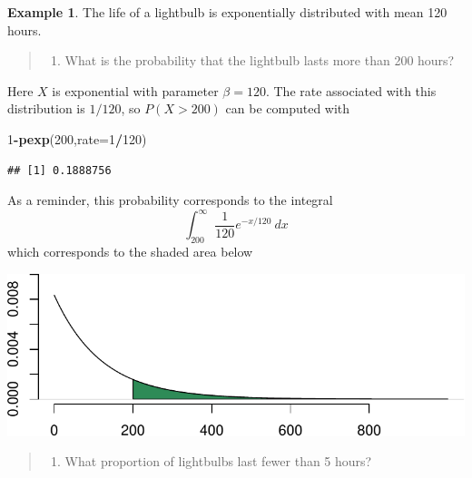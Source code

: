 \documentclass[
]{book}
\newenvironment{Shaded}{\begin{snugshade}}{\end{snugshade}}
\newcommand{\AttributeTok}[1]{\textcolor[rgb]{0.13,0.29,0.53}{#1}}
\newcommand{\DecValTok}[1]{\textcolor[rgb]{0.00,0.00,0.81}{#1}}
\newcommand{\FunctionTok}[1]{\textcolor[rgb]{0.13,0.29,0.53}{\textbf{#1}}}
\newcommand{\NormalTok}[1]{#1}
\newcommand{\SpecialCharTok}[1]{\textcolor[rgb]{0.81,0.36,0.00}{\textbf{#1}}}
\providecommand{\tightlist}{%
  \setlength{\itemsep}{0pt}\setlength{\parskip}{0pt}}
\theoremstyle{definition}
\theoremstyle{definition}
\newtheorem{example}{Example}[chapter]
\theoremstyle{definition}
\theoremstyle{definition}
\theoremstyle{remark}
\begin{document}
\begin{example}
\protect\hypertarget{exm:exp-lightbulb-R}{}\label{exm:exp-lightbulb-R}The life of a lightbulb is exponentially distributed with mean 120 hours.

\begin{quote}
\begin{enumerate}
\def\labelenumi{\alph{enumi})}
\tightlist
\item
  What is the probability that the lightbulb lasts more than 200 hours?
\end{enumerate}
\end{quote}

Here \(X\) is exponential with parameter \(\beta = 120\). The rate associated with this distribution is \(1/120\), so \(P(X > 200)\) can be computed with

\begin{Shaded}
\begin{Highlighting}[]
\DecValTok{1}\SpecialCharTok{{-}}\FunctionTok{pexp}\NormalTok{(}\DecValTok{200}\NormalTok{,}\AttributeTok{rate=}\DecValTok{1}\SpecialCharTok{/}\DecValTok{120}\NormalTok{)}
\end{Highlighting}
\end{Shaded}

\begin{verbatim}
## [1] 0.1888756
\end{verbatim}

As a reminder, this probability corresponds to the integral
\[\int_{200}^\infty \frac{1}{120}e^{-x/120}~dx\] which corresponds to the shaded area below

\begin{center}\includegraphics{math340-notes_files/figure-latex/unnamed-chunk-176-1} \end{center}

\begin{quote}
\begin{enumerate}
\def\labelenumi{\alph{enumi})}
\setcounter{enumi}{1}
\tightlist
\item
  What proportion of lightbulbs last fewer than 5 hours?
\end{enumerate}
\end{quote}


\end{example}
\end{document}
